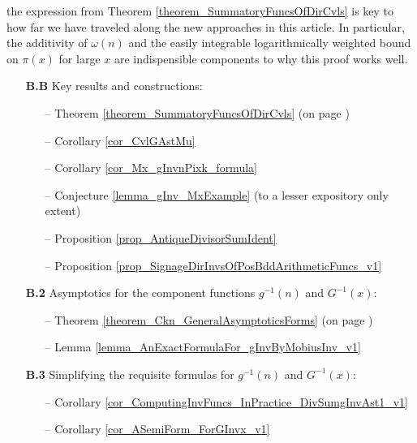 \documentclass[11pt,reqno,a4letter]{article}
\numberwithin{figure}{section}
\numberwithin{table}{section}
\theoremstyle{plain}
\numberwithin{theorem}{section}
\theoremstyle{definition}
\begin{document}
\begin{itemize}[noitemsep,topsep=0pt]
     the expression from Theorem \ref{theorem_SummatoryFuncsOfDirCvls} 
     is key to how far we have traveled along the new approaches in this article. 
     In particular, the additivity of $\omega(n)$ and the easily integrable logarithmically weighted bound on 
     $\pi(x)$ for large $x$ are indispensible components to why this proof works well. 
     \begin{itemize}[noitemsep,topsep=0pt] 
     \item[\textbf{B.B}] Key results and constructions: 
          \begin{itemize}[noitemsep,topsep=0pt]
          \item[--] \small{Theorem \ref{theorem_SummatoryFuncsOfDirCvls} 
                    (on page \pageref{proofOf_theorem_SummatoryFuncsOfDirCvls})} 
          \item[--] \small{Corollary \ref{cor_CvlGAstMu}} 
          \item[--] \small{Corollary \ref{cor_Mx_gInvnPixk_formula}} 
          \item[--] \small{Conjecture \ref{lemma_gInv_MxExample} (to a lesser expository only extent)} 
          \item[--] \small{Proposition \ref{prop_AntiqueDivisorSumIdent}} 
          \item[--] \small{Proposition \ref{prop_SignageDirInvsOfPosBddArithmeticFuncs_v1}} 
          \end{itemize} 
     \item[\textbf{B.2}] Asymptotics for the component functions $g^{-1}(n)$ and $G^{-1}(x)$: 
          \begin{itemize}[noitemsep,topsep=0pt]
          \item[--] \small{Theorem \ref{theorem_Ckn_GeneralAsymptoticsForms} 
                    (on page \pageref{proofOf_theorem_Ckn_GeneralAsymptoticsForms})} 
          \item[--] \small{Lemma \ref{lemma_AnExactFormulaFor_gInvByMobiusInv_v1}} 
          \end{itemize} 
     \item[\textbf{B.3}] Simplifying the requisite formulas for $g^{-1}(n)$ and $G^{-1}(x)$: 
          \begin{itemize}[noitemsep,topsep=0pt]
          \item[--] \small{Corollary \ref{cor_ComputingInvFuncs_InPractice_DivSumgInvAst1_v1}} 
          \item[--] \small{Corollary \ref{cor_ASemiForm_ForGInvx_v1}} 
          \end{itemize} 

\end{itemize}
\end{itemize}
\end{document}
